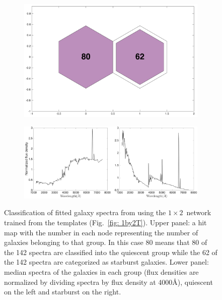             \begin{figure}
                \begin{subfigure}[b]{0.45\textwidth}
                    \centering
                    \includegraphics[width=\textwidth]{images0.01/1d/hit_v_1_by_2.png}
                \end{subfigure}
                \hfill
                \begin{subfigure}[b]{0.45\textwidth}
                     \includegraphics[width=\textwidth]{images0.01/1d/SED_total1by2_fluxdensity.png}
                \end{subfigure}
                \caption{Classification of fitted galaxy spectra from \citet{Hossein12} using the $1\times2$~network trained from the \citet{Kinney96} templates (Fig.~\ref{fig: 1by2T}). Upper panel: a hit map with the number in each node representing the number of galaxies belonging to that group. In this case 80 means that 80 of the 142 spectra are classified into the quiescent group while the 62 of the 142 spectra are categorized as starburst galaxies. Lower panel: median spectra of the galaxies in each group (flux densities are normalized by dividing spectra by flux density at 4000\AA), quiescent on the left and starburst on the right.}
                \label{fig: 1by2V}
            \end{figure}          
            
